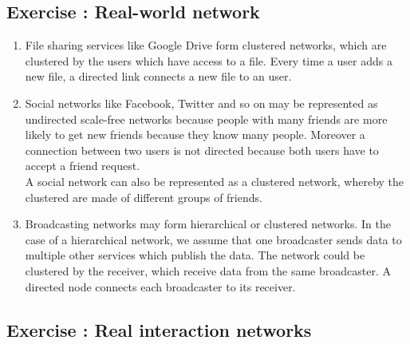 \documentclass[10pt,a4paper]{article}
\newcommand{\exercise}[1]
{
  \stepcounter{subsection}
  \subsection*{Exercise \thesubsection: #1}

}
\begin{document}
\exercise{Real-world network}
\begin{enumerate}
\item File sharing services like Google Drive form clustered networks, which are clustered by the users which have access to a file. Every time a user adds a new file, a directed link connects a new file to an user.
\item Social networks like Facebook, Twitter and so on may be represented as undirected scale-free networks because people with many friends are more likely to get new friends because they know many people. Moreover a connection between two users is not directed because both users have to accept a friend request.\\
A social network can also be represented as a clustered network, whereby the clustered are made of different groups of friends.
\item Broadcasting networks may form hierarchical or clustered networks. In the case of a hierarchical network, we assume that one broadcaster sends data to multiple other services which publish the data. The network could be clustered by the receiver, which receive data from the same broadcaster. A directed node connects each broadcaster to its receiver.
\end{enumerate}
\newpage
\exercise{Real interaction networks}
\end{document}
